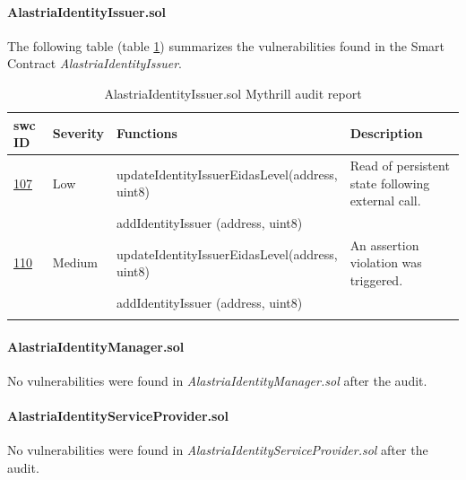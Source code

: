 \paragraph{AlastriaIdentityIssuer.sol}
The following table (table \ref{tab:AlastriaIdentityIssuer}) summarizes the vulnerabilities found in the Smart Contract \textit{AlastriaIdentityIssuer}.
\begin{longtable}{||p{0.1\linewidth} | p{0.11\linewidth} | p{0.45\linewidth} | p{0.35\linewidth}||}
    \hline
    \textbf{\acrshort{swc} ID}                      & \textbf{Severity} & \textbf{Functions}                                      & \textbf{Description}                              \\ [0.5ex]
    \hline\hline
    \href{https://swcregistry.io/docs/SWC-107}{107} & Low               & updateIdentityIssuerEidasLevel\newline (address, uint8) & Read of persistent state following external call. \\
    \cline{3-3}
                                                    &                   & addIdentityIssuer (address, uint8)                      &                                                   \\[1ex]
    \hline
    \href{https://swcregistry.io/docs/SWC-110}{110} & Medium            & updateIdentityIssuerEidasLevel\newline (address, uint8) & An assertion violation was triggered.             \\
    \cline{3-3}
                                                    &                   & addIdentityIssuer (address, uint8)                      &                                                   \\
    \cline{3-3}
    \hline
    \caption{AlastriaIdentityIssuer.sol Mythrill audit report}
    \label{tab:AlastriaIdentityIssuer}
\end{longtable}

\paragraph{AlastriaIdentityManager.sol}
No vulnerabilities were found in \textit{AlastriaIdentityManager.sol} after the audit.

\paragraph{AlastriaIdentityServiceProvider.sol}
No vulnerabilities were found in \textit{AlastriaIdentityServiceProvider.sol} after the audit.

